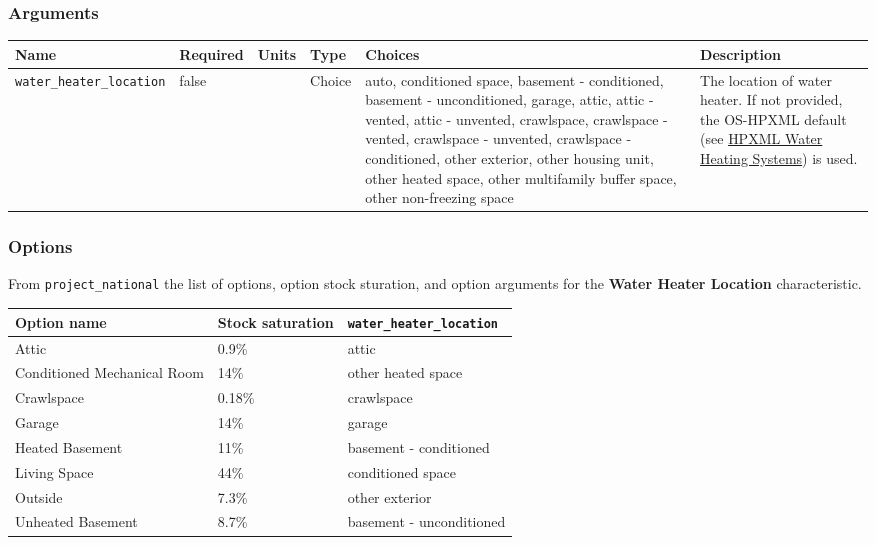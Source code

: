 \subsubsection{Arguments}\label{arguments-104}

\begin{longtable}[]{@{}llllll@{}}
\toprule\noalign{}
Name & Required & Units & Type & Choices & Description \\
\midrule\noalign{}
\endhead
\bottomrule\noalign{}
\endlastfoot
\texttt{water\_heater\_location} & false & & Choice & auto, conditioned
space, basement - conditioned, basement - unconditioned, garage, attic,
attic - vented, attic - unvented, crawlspace, crawlspace - vented,
crawlspace - unvented, crawlspace - conditioned, other exterior, other
housing unit, other heated space, other multifamily buffer space, other
non-freezing space & The location of water heater. If not provided, the
OS-HPXML default (see
\href{https://openstudio-hpxml.readthedocs.io/en/v1.7.0/workflow_inputs.html\#hpxml-water-heating-systems}{HPXML
Water Heating Systems}) is used. \\
\end{longtable}

\subsubsection{Options}\label{options-152}

From \texttt{project\_national} the list of options, option stock
sturation, and option arguments for the \textbf{Water Heater Location}
characteristic.

\begin{longtable}[]{@{}lll@{}}
\toprule\noalign{}
Option name & Stock saturation & \texttt{water\_heater\_location} \\
\midrule\noalign{}
\endhead
\bottomrule\noalign{}
\endlastfoot
Attic & 0.9\% & attic \\
Conditioned Mechanical Room & 14\% & other heated space \\
Crawlspace & 0.18\% & crawlspace \\
Garage & 14\% & garage \\
Heated Basement & 11\% & basement - conditioned \\
Living Space & 44\% & conditioned space \\
Outside & 7.3\% & other exterior \\
Unheated Basement & 8.7\% & basement - unconditioned \\
\end{longtable}









